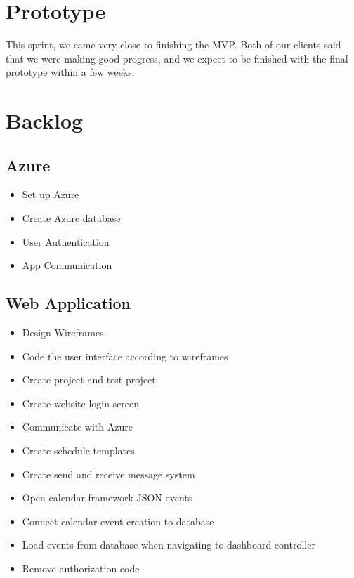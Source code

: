 \documentclass{article}
\begin{document}
{\section*{Prototype}
This sprint, we came very close to finishing the MVP. Both of our clients said that we were making good progress, and we expect to be finished with the final prototype within a few weeks. 

\section*{Backlog}
\subsection*{Azure}
\begin{itemize}
\item Set up Azure
\item Create Azure database
\item User Authentication
\item App Communication
\end{itemize}

\subsection*{Web Application}
\begin{itemize}
\item Design Wireframes
\item Code the user interface according to wireframes
\item Create project and test project
\item Create website login screen
\item Communicate with Azure
\item Create schedule templates
\item Create send and receive message system
\item Open calendar framework JSON events
\item Connect calendar event creation to database
\item Load events from database when navigating to dashboard controller
\item Remove authorization code
\end{itemize}

}
\end{document}
